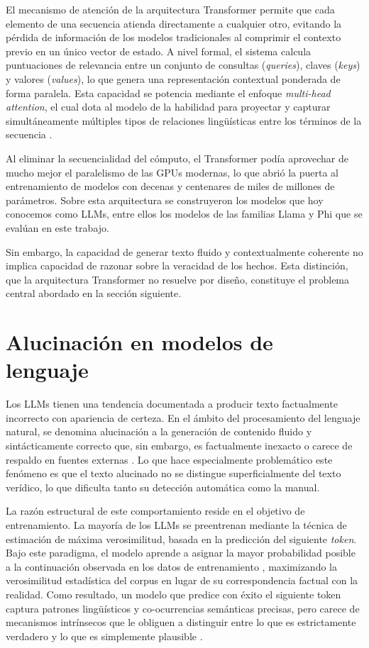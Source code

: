 El mecanismo de atención de la arquitectura Transformer permite que cada elemento de una secuencia atienda directamente a cualquier otro, evitando la pérdida de información de los modelos tradicionales al comprimir el contexto previo en un único vector de estado. A nivel formal, el sistema calcula puntuaciones de relevancia entre un conjunto de consultas (\textit{queries}), claves (\textit{keys}) y valores (\textit{values}), lo que genera una representación contextual ponderada de forma paralela. Esta capacidad se potencia mediante el enfoque \textit{multi-head attention}, el cual dota al modelo de la habilidad para proyectar y capturar simultáneamente múltiples tipos de relaciones lingüísticas entre los términos de la secuencia \cite{vaswani2017attention}.

Al eliminar la secuencialidad del cómputo, el Transformer podía aprovechar de mucho mejor el paralelismo de las GPUs modernas, lo que abrió la puerta al entrenamiento de modelos con decenas y centenares de miles de millones de parámetros. Sobre esta arquitectura se construyeron los modelos que hoy conocemos como LLMs, entre ellos los modelos de las familias Llama y Phi que se evalúan en este trabajo.

Sin embargo, la capacidad de generar texto fluido y contextualmente coherente no implica capacidad de razonar sobre la veracidad de los hechos. Esta distinción, que la arquitectura Transformer no resuelve por diseño, constituye el problema central abordado en la sección siguiente.

\section{Alucinación en modelos de lenguaje}

Los LLMs tienen una tendencia documentada a producir texto factualmente incorrecto con apariencia de certeza. En el ámbito del procesamiento del lenguaje natural, se denomina alucinación a la generación de contenido fluido y sintácticamente correcto que, sin embargo, es factualmente inexacto o carece de respaldo en fuentes externas \cite{alansari2025hallucination}. Lo que hace especialmente problemático este fenómeno es que el texto alucinado no se distingue superficialmente del texto verídico, lo que dificulta tanto su detección automática como la manual.

La razón estructural de este comportamiento reside en el objetivo de entrenamiento. La mayoría de los LLMs se preentrenan mediante la técnica de estimación de máxima verosimilitud, basada en la predicción del siguiente \textit{token}. Bajo este paradigma, el modelo aprende a asignar la mayor probabilidad posible a la continuación observada en los datos de entrenamiento \cite{welleck2019neural}, maximizando la verosimilitud estadística del corpus en lugar de su correspondencia factual con la realidad. Como resultado, un modelo que predice con éxito el siguiente token captura patrones lingüísticos y co-ocurrencias semánticas precisas, pero carece de mecanismos intrínsecos que le obliguen a distinguir entre lo que es estrictamente verdadero y lo que es simplemente plausible \cite{alansari2025hallucination}.

